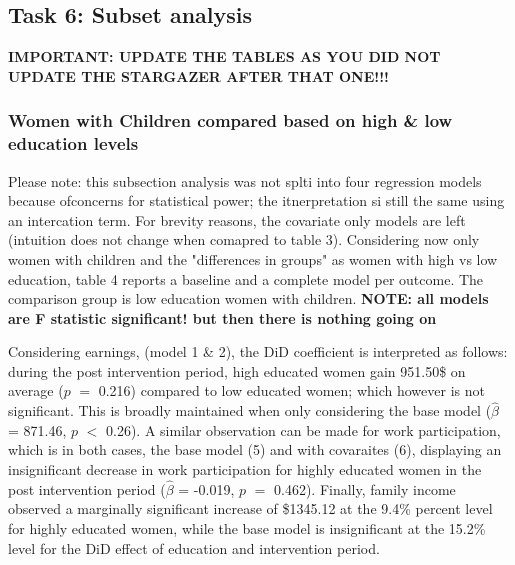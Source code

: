 \documentclass[a4paper]{article}
\begin{document}
\subsection{Task 6: Subset analysis}

\textbf{IMPORTANT: UPDATE THE TABLES AS YOU DID NOT UPDATE THE STARGAZER AFTER THAT ONE!!!}


\subsubsection{Women with Children compared based on high \& low education levels}
Please note: this subsection analysis was not splti into four regression models because ofconcerns for statistical power; the itnerpretation si still the same using an intercation term.
For brevity reasons, the covariate only models are left (intuition does not change when comapred to table 3). Considering now only women with children and the "differences in groups" as women with high vs low education, table 4 reports a baseline and a complete model per outcome. The comparison group is low education women with children.
\textbf{NOTE: all models are F statistic significant! but then there is nothing going on}

Considering earnings, (model 1 \& 2), the DiD coefficient is interpreted as follows: during the post intervention period, high educated women gain 951.50\$ on average ($p$ $=$ 0.216) compared to low educated women; which however is not significant. This is broadly maintained when only considering the base model ($\hat{\beta}$ = 871.46, $p$ $<$ 0.26). A similar observation can be made for work participation, which is in both cases, the base model (5) and with covaraites (6), displaying an insignificant decrease in work participation for highly educated women in the post intervention period ($\hat{\beta}$ = -0.019, $p$ $=$ 0.462). Finally, family income observed a marginally significant increase of \$1345.12 at the 9.4\% percent level for highly educated women, while the base model is insignificant at the 15.2\% level for the DiD effect of education and intervention period. 
\end{document}
